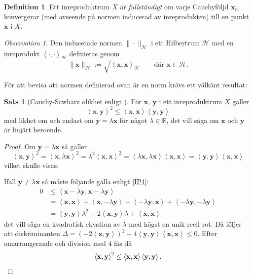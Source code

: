 \documentclass[a4paper, 12pt]{report}
\theoremstyle{definition}
\newtheorem{thm}{Sats}[section]
\newtheorem{defi}{Definition}[section]
\theoremstyle{remark}
\newtheorem*{rem}{Observation}
\newcommand{\bfx}{\mathbf{x}}
\newcommand{\llangle}{\left\langle}
\newcommand{\rrangle}{\right\rangle}
\begin{document}
\begin{defi}
	Ett inreproduktrum $X$ är \emph{fullständigt} om varje Cauchyföljd $\mathbf{x}_n$ konvergerar (med avseende på normen inducerad av inreprodukten) till en punkt $\mathbf{x}$ i $X$.
\end{defi}

\begin{rem}
	Den inducerade normen $\|\cdot\|_\mathcal{H}$ i ett Hilbertrum $\mathcal{H}$ med en inreprodukt $\llangle \cdot, \cdot\rrangle_\mathcal{H}$ definieras genom
	\begin{equation*}
		\| \mathbf{x}\|_\mathcal{H} := \sqrt{\llangle \bfx, \bfx \rrangle_\mathcal{H}} \qquad \text{där } \bfx \in \mathcal{H}.
	\end{equation*}
\end{rem}
För att bevisa att normen definierad ovan är en norm krävs ett välkänt resultat:
\begin{thm}[Cauchy-Scwharz olikhet enligt \cite{Young}]\label{CauchySchwarz}
	För $\bfx,~\mathbf{y}$ i ett inreproduktrum $X$ gäller
	\begin{equation*}
	\llangle\bfx, \mathbf{y}\rrangle^2 \leq \llangle\bfx, \bfx \rrangle \llangle \mathbf{y}, \mathbf{y} \rrangle
	\end{equation*}
	med likhet om och endast om $\mathbf{y} = \lambda \bfx$ för något $\lambda \in \mathbb{R}$, det vill säga om $\bfx$ och $\mathbf{y}$ är linjärt beroende.
\end{thm}
\begin{proof}
	Om $\mathbf{y} = \lambda \bfx$ så gäller
	\begin{equation*}
	\llangle\bfx, \mathbf{y}\rrangle^2 = \llangle\bfx, \lambda \bfx\rrangle^2 = \lambda^2\llangle\bfx, \bfx\rrangle^2 = \llangle \lambda\bfx, \lambda\bfx \rrangle\llangle \bfx, \bfx \rrangle = \llangle \mathbf{y}, \mathbf{y} \rrangle\llangle \bfx, \bfx \rrangle
	\end{equation*}
	vilket skulle visas.
	
	Ifall $\mathbf{y} \neq \lambda \bfx$ så måste följande gälla enligt \ref{IP4}:
	\begin{align*}
	0 &\leq\llangle \bfx - \lambda\mathbf{y} , \bfx - \lambda\mathbf{y} \rrangle\\
	&= \llangle \bfx, \bfx \rrangle + \llangle \bfx , - \lambda \mathbf{y} \rrangle + \llangle - \lambda \mathbf{y} , \bfx \rrangle + \llangle -\lambda\mathbf{y}, -\lambda\mathbf{y}\rrangle\\
	&=  \llangle\mathbf{y}, \mathbf{y} \rrangle \lambda^2 - 2 \llangle \bfx, \mathbf{y}\rrangle \lambda + \llangle \bfx, \bfx \rrangle
	\end{align*}
	det vill säga en kvadratisk ekvation av $\lambda$ med högst en unik reell rot. Då följer att diskriminanten $\Delta=\left(-2\llangle\bfx,\mathbf{y}\rrangle\right)^2 - 4 \llangle \mathbf{y}, \mathbf{y}\rrangle\llangle\bfx,\bfx\rrangle\leq0$. Efter omarrangerande och division med $4$ fås då
	\begin{equation*}
	\llangle \bfx, \mathbf{y}\rrangle^2 \leq \llangle \bfx, \bfx \rrangle \llangle \mathbf{y}, \mathbf{y} \rrangle. \qedhere
	\end{equation*}
\end{proof}
\end{document}
